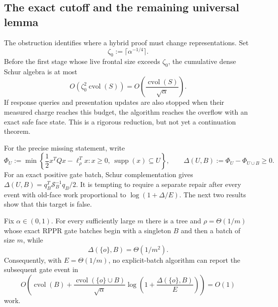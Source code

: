\subsection{The exact cutoff and the remaining universal lemma}
\label{sec:exact-cutoff}

The obstruction identifies where a hybrid proof must change representations.
Set
\begin{equation}
 \zeta_0:=\lceil\alpha^{-1/4}\rceil.
 \label{eq:separator-cutoff}
\end{equation}
Before the first stage whose live frontal size exceeds $\zeta_0$, the cumulative
dense Schur algebra is at most
\begin{equation}
 O\!\left(\zeta_0^2\operatorname{cvol}(S)\right)
 =O\!\left(\frac{\operatorname{cvol}(S)}{\sqrt\alpha}\right).
 \label{eq:cutoff-dense-work}
\end{equation}
If response queries and
presentation updates are also stopped when their measured charge reaches
this budget, the algorithm reaches the overflow with an exact safe face
state.  This is a rigorous reduction, but not yet a continuation theorem.

For the precise missing statement, write
\begin{equation}
 \Phi_U:=\min\left\{
   \frac12x^TQx-\ell_\rho^Tx:x\geq0,
   \ \operatorname{supp}(x)\subseteq U
 \right\},
 \qquad
 \Delta(U,B):=\Phi_U-\Phi_{U\cup B}\geq0.
 \label{eq:face-shock}
\end{equation}
For an exact positive gate batch, Schur complementation gives
$\Delta(U,B)=q_B^T\mathcal S_B^{-1}q_B/2$.  It is tempting to require a
separate repair after every event with old-face work proportional to
$\log(1+\Delta/E)$.  The next two results show that this target is false.

\begin{theorem}
\label{thm:shock-output-obstruction}
Fix $\alpha\in(0,1)$.  For every sufficiently large $m$ there is a tree and
$\rho=\Theta(1/m)$ whose exact RPPR gate batches begin with a singleton $B$
and then a batch of size $m$, while
\begin{equation}
 \Delta(\{o\},B)=\Theta(1/m^2).
 \label{eq:tiny-shock-large-output}
\end{equation}
Consequently, with $E=\Theta(1/m)$, no explicit-batch algorithm can report
the subsequent gate event in
\begin{equation}
 O\!\left(
  \operatorname{cvol}(B)
  +\frac{\operatorname{cvol}(\{o\}\cup B)}{\sqrt\alpha}
   \log\!\left(1+\frac{\Delta(\{o\},B)}E\right)
 \right)=O(1)
 \label{eq:false-shock-output-bound}
\end{equation}
work.
\end{theorem}

